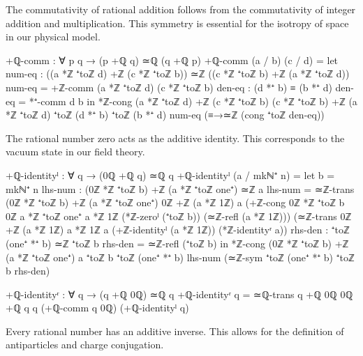 \documentclass[11pt,a4paper]{book}
\begin{document}
The commutativity of rational addition follows from the commutativity of integer addition and multiplication. This symmetry is essential for the isotropy of space in our physical model.

\begin{code}
+ℚ-comm : ∀ p q → (p +ℚ q) ≃ℚ (q +ℚ p)
+ℚ-comm (a / b) (c / d) = 
  let num-eq : ((a *ℤ ⁺toℤ d) +ℤ (c *ℤ ⁺toℤ b)) ≃ℤ ((c *ℤ ⁺toℤ b) +ℤ (a *ℤ ⁺toℤ d))
      num-eq = +ℤ-comm (a *ℤ ⁺toℤ d) (c *ℤ ⁺toℤ b)
      den-eq : (d *⁺ b) ≡ (b *⁺ d)
      den-eq = *⁺-comm d b
  in *ℤ-cong {(a *ℤ ⁺toℤ d) +ℤ (c *ℤ ⁺toℤ b)} 
             {(c *ℤ ⁺toℤ b) +ℤ (a *ℤ ⁺toℤ d)}
             {⁺toℤ (d *⁺ b)} {⁺toℤ (b *⁺ d)}
             num-eq (≡→≃ℤ (cong ⁺toℤ den-eq))
\end{code}

The rational number zero acts as the additive identity. This corresponds to the vacuum state in our field theory.

\begin{code}
+ℚ-identityˡ : ∀ q → (0ℚ +ℚ q) ≃ℚ q
+ℚ-identityˡ (a / mkℕ⁺ n) = 
  let b = mkℕ⁺ n
      lhs-num : (0ℤ *ℤ ⁺toℤ b) +ℤ (a *ℤ ⁺toℤ one⁺) ≃ℤ a
      lhs-num = ≃ℤ-trans {(0ℤ *ℤ ⁺toℤ b) +ℤ (a *ℤ ⁺toℤ one⁺)} 
                         {0ℤ +ℤ (a *ℤ 1ℤ)} 
                         {a}
                (+ℤ-cong {0ℤ *ℤ ⁺toℤ b} {0ℤ} {a *ℤ ⁺toℤ one⁺} {a *ℤ 1ℤ} 
                         (*ℤ-zeroˡ (⁺toℤ b)) 
                         (≃ℤ-refl (a *ℤ 1ℤ)))
                (≃ℤ-trans {0ℤ +ℤ (a *ℤ 1ℤ)} {a *ℤ 1ℤ} {a}
                          (+ℤ-identityˡ (a *ℤ 1ℤ))
                          (*ℤ-identityʳ a))
      rhs-den : ⁺toℤ (one⁺ *⁺ b) ≃ℤ ⁺toℤ b
      rhs-den = ≃ℤ-refl (⁺toℤ b)
  in *ℤ-cong {(0ℤ *ℤ ⁺toℤ b) +ℤ (a *ℤ ⁺toℤ one⁺)} {a} {⁺toℤ b} {⁺toℤ (one⁺ *⁺ b)}
             lhs-num 
             (≃ℤ-sym {⁺toℤ (one⁺ *⁺ b)} {⁺toℤ b} rhs-den)

+ℚ-identityʳ : ∀ q → (q +ℚ 0ℚ) ≃ℚ q
+ℚ-identityʳ q = ≃ℚ-trans {q +ℚ 0ℚ} {0ℚ +ℚ q} {q} (+ℚ-comm q 0ℚ) (+ℚ-identityˡ q)
\end{code}

Every rational number has an additive inverse. This allows for the definition of antiparticles and charge conjugation.
\end{document}
